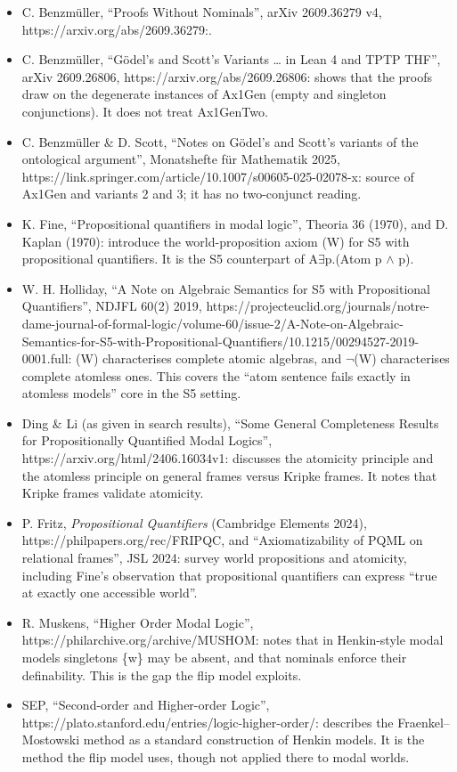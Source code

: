 \documentclass{article}
\begin{document}
\begin{itemize}
\item C. Benzmüller, ``Proofs Without Nominals'', arXiv 2609.36279 v4, https://arxiv.org/abs/2609.36279:.
\item C. Benzmüller, ``Gödel's and Scott's Variants \ldots{} in Lean 4 and TPTP THF'', arXiv 2609.26806, https://arxiv.org/abs/2609.26806: shows that the proofs draw on the degenerate instances of Ax1Gen (empty and singleton conjunctions). It does not treat Ax1GenTwo.
\item C. Benzmüller \& D. Scott, ``Notes on Gödel's and Scott's variants of the ontological argument'', Monatshefte für Mathematik 2025, https://link.springer.com/article/10.1007/s00605-025-02078-x: source of Ax1Gen and variants 2 and 3; it has no two-conjunct reading.
\item K. Fine, ``Propositional quantifiers in modal logic'', Theoria 36 (1970), and D. Kaplan (1970): introduce the world-proposition axiom (W) for S5 with propositional quantifiers. It is the S5 counterpart of A$\exists$p.(Atom p $\wedge$ p).
\item W. H. Holliday, ``A Note on Algebraic Semantics for S5 with Propositional Quantifiers'', NDJFL 60(2) 2019, https://projecteuclid.org/journals/notre-dame-journal-of-formal-logic/volume-60/issue-2/A-Note-on-Algebraic-Semantics-for-S5-with-Propositional-Quantifiers/10.1215/00294527-2019-0001.full: (W) characterises complete atomic algebras, and $\neg$(W) characterises complete atomless ones. This covers the ``atom sentence fails exactly in atomless models'' core in the S5 setting.
\item Ding \& Li (as given in search results), ``Some General Completeness Results for Propositionally Quantified Modal Logics'', https://arxiv.org/html/2406.16034v1: discusses the atomicity principle and the atomless principle on general frames versus Kripke frames. It notes that Kripke frames validate atomicity.
\item P. Fritz, \emph{Propositional Quantifiers} (Cambridge Elements 2024), https://philpapers.org/rec/FRIPQC, and ``Axiomatizability of PQML on relational frames'', JSL 2024: survey world propositions and atomicity, including Fine's observation that propositional quantifiers can express ``true at exactly one accessible world''.
\item R. Muskens, ``Higher Order Modal Logic'', https://philarchive.org/archive/MUSHOM: notes that in Henkin-style modal models singletons \{w\} may be absent, and that nominals enforce their definability. This is the gap the flip model exploits.
\item SEP, ``Second-order and Higher-order Logic'', https://plato.stanford.edu/entries/logic-higher-order/: describes the Fraenkel--Mostowski method as a standard construction of Henkin models. It is the method the flip model uses, though not applied there to modal worlds.

\end{itemize}
\end{document}
